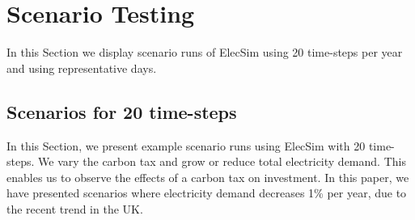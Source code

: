 



\clearpage
\section{Scenario Testing}
\label{elecsim:sec:scenarios}

In this Section we display scenario runs of ElecSim using 20 time-steps per year and using representative days.

\subsection{Scenarios for 20 time-steps}

In this Section, we present example scenario runs using ElecSim with 20 time-steps. We vary the carbon tax and grow or reduce total electricity demand. This enables us to observe the effects of a carbon tax on investment. In this paper, we have presented scenarios where electricity demand decreases 1\% per year, due to the recent trend in the UK.




